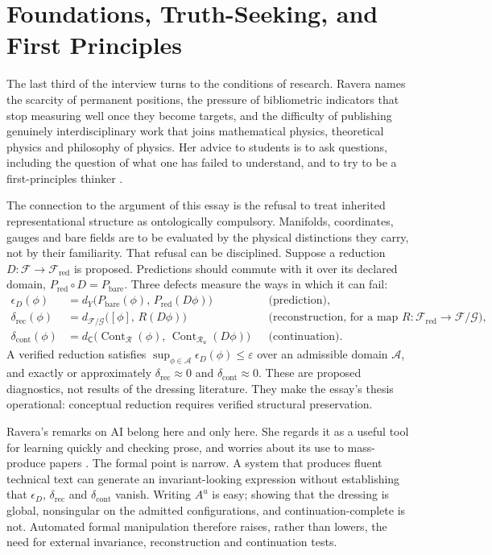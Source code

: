 \documentclass[11pt]{article}
\theoremstyle{plain}
\theoremstyle{definition}
\theoremstyle{remark}
\newcommand{\F}{\mathcal F}
\newcommand{\G}{\mathcal G}
\newcommand{\R}{\mathcal R}
\newcommand{\Cont}{\operatorname{Cont}}
\begin{document}
\section{Foundations, Truth-Seeking, and First Principles}\label{sec:method}

The last third of the interview turns to the conditions of research. Ravera names the scarcity of permanent positions, the pressure of bibliometric indicators that stop measuring well once they become targets, and the difficulty of publishing genuinely interdisciplinary work that joins mathematical physics, theoretical physics and philosophy of physics. Her advice to students is to ask questions, including the question of what one has failed to understand, and to try to be a first-principles thinker \cite{toe}.

The connection to the argument of this essay is the refusal to treat inherited representational structure as ontologically compulsory. Manifolds, coordinates, gauges and bare fields are to be evaluated by the physical distinctions they carry, not by their familiarity. That refusal can be disciplined. Suppose a reduction $D:\F\to\F_{\mathrm{red}}$ is proposed. Predictions should commute with it over its declared domain, $P_{\mathrm{red}}\circ D=P_{\mathrm{bare}}$. Three defects measure the ways in which it can fail:
\begin{align}
\epsilon_D(\phi)&=d_Y\big(P_{\mathrm{bare}}(\phi),\,P_{\mathrm{red}}(D\phi)\big) &&\text{(prediction)},\\
\delta_{\mathrm{rec}}(\phi)&=d_{\F/\G}\big([\phi],\,R(D\phi)\big) &&\text{(reconstruction, for a map } R:\F_{\mathrm{red}}\to\F/\G),\\
\delta_{\mathrm{cont}}(\phi)&=d_{\mathsf C}\big(\Cont_\R(\phi),\,\Cont_{\R_u}(D\phi)\big) &&\text{(continuation)}.
\end{align}
A verified reduction satisfies $\sup_{\phi\in\mathcal A}\epsilon_D(\phi)\le\varepsilon$ over an admissible domain $\mathcal A$, and exactly or approximately $\delta_{\mathrm{rec}}\approx0$ and $\delta_{\mathrm{cont}}\approx0$. These are proposed diagnostics, not results of the dressing literature. They make the essay's thesis operational: conceptual reduction requires verified structural preservation.

Ravera's remarks on AI belong here and only here. She regards it as a useful tool for learning quickly and checking prose, and worries about its use to mass-produce papers \cite{toe}. The formal point is narrow. A system that produces fluent technical text can generate an invariant-looking expression without establishing that $\epsilon_D$, $\delta_{\mathrm{rec}}$ and $\delta_{\mathrm{cont}}$ vanish. Writing $A^u$ is easy; showing that the dressing is global, nonsingular on the admitted configurations, and continuation-complete is not. Automated formal manipulation therefore raises, rather than lowers, the need for external invariance, reconstruction and continuation tests.
\end{document}
